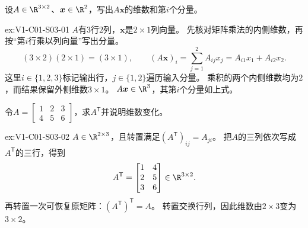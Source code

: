 \begin{SLChapterExercisePairSection}
\begin{exercise}[维数核对]\label{ex:V1-C01-S03-01}
设$A\in\R^{3\times2}$、$\boldsymbol{x}\in\R^2$，写出$A\boldsymbol{x}$的维数和第$i$个分量。
\end{exercise}
\label{sol:V1-C01-S03-01}
\begin{chapterexercisesolution}{ex:V1-C01-S03-01}
\SolGiven $A$有$3$行$2$列，$\boldsymbol{x}$是$2\times1$列向量。
\SolPlan 先核对矩阵乘法的内侧维数，再按“第$i$行乘以列向量”写出分量。
\SolDerive
\[
(3\times2)(2\times1)=(3\times1),
\qquad
(A\boldsymbol{x})_i=\sum_{j=1}^{2}A_{ij}x_j
=A_{i1}x_1+A_{i2}x_2.
\]
这里$i\in\{1,2,3\}$标记输出行，$j\in\{1,2\}$遍历输入分量。
\SolCheck 乘积的两个内侧维数均为$2$，而结果保留外侧维数$3\times1$。
\SolAnswer $A\boldsymbol{x}\in\R^3$，其第$i$个分量如上式。
\end{chapterexercisesolution}

\begin{exercise}[转置]\label{ex:V1-C01-S03-02}
令$A=\begin{bmatrix}1&2&3\\4&5&6\end{bmatrix}$，求$A^{\mathsf T}$并说明维数变化。
\end{exercise}
\label{sol:V1-C01-S03-02}
\begin{chapterexercisesolution}{ex:V1-C01-S03-02}
\SolGiven $A\in\R^{2\times3}$，且转置满足$(A^{\mathsf T})_{ij}=A_{ji}$。
\SolDerive 把$A$的三列依次写成$A^{\mathsf T}$的三行，得到
\[
A^{\mathsf T}=\begin{bmatrix}1&4\\2&5\\3&6\end{bmatrix}\in\R^{3\times2}.
\]
\SolCheck 再转置一次可恢复原矩阵：$(A^{\mathsf T})^{\mathsf T}=A$。
\SolAnswer 转置交换行列，因此维数由$2\times3$变为$3\times2$。
\end{chapterexercisesolution}


\end{SLChapterExercisePairSection}
